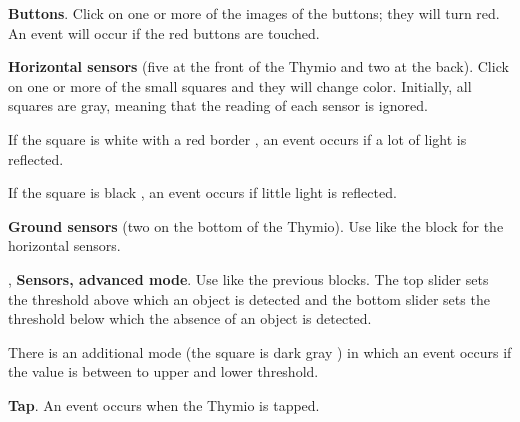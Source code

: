 \label{a.blocks}


 \textbf{Buttons}. Click on one or more of the images
of the buttons; they will turn red. An event will occur if the red
buttons are touched.

\bigskip\bigskip


 \textbf{Horizontal sensors} (five at the front of the
Thymio and two at the back). Click on one or more of the small squares
and they will change color. Initially, all squares are gray, meaning
that the reading of each sensor is ignored.

If the square is white with a red border , an event
occurs if a lot of light is reflected.

If the square is black , an event occurs if little
light is reflected.

\bigskip


\bigskip

 \textbf{Ground sensors} (two on the bottom of the
Thymio). Use like the block for the horizontal sensors.

\bigskip\bigskip

, 
\textbf{Sensors, advanced mode}. Use like the previous blocks. The top
slider sets the threshold above which an object is detected and the
bottom slider sets the threshold below which the absence of an object is
detected.

\bigskip\bigskip

There is an additional mode (the square is dark gray )
in which an event occurs if the value is between to upper and lower
threshold.

\bigskip\bigskip\bigskip

 \textbf{Tap}. An event occurs when the Thymio is
tapped.

